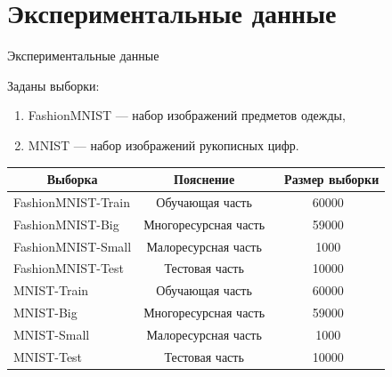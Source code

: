 \documentclass[10pt,pdf,hyperref={unicode}]{beamer}
\begin{document}
\section{Экспериментальные данные}
\begin{frame}{Экспериментальные данные}
\justifying

Заданы выборки:
\begin{enumerate}[1)]
    \item FashionMNIST --- набор изображений предметов одежды,
    \item MNIST --- набор изображений рукописных цифр.
\end{enumerate}

\begin{table}[h!t]
\begin{center}
\label{table_1}
\begin{tabular}{|c|c|c|}
\hline
	Выборка & Пояснение &\ Размер выборки\\
	\hline
	\multicolumn{1}{|l|}{FashionMNIST-Train}
	& Обучающая часть& 60000\\
	\hline
	\multicolumn{1}{|l|}{FashionMNIST-Big}
	& Многоресурсная часть& 59000\\
	\hline
	\multicolumn{1}{|l|}{FashionMNIST-Small}
	& Малоресурсная часть& 1000\\
	\hline
	\multicolumn{1}{|l|}{FashionMNIST-Test}
	& Тестовая часть& 10000\\
	\hline
	\multicolumn{1}{|l|}{MNIST-Train}
	& Обучающая часть& 60000\\
	\hline
	\multicolumn{1}{|l|}{MNIST-Big}
	& Многоресурсная часть& 59000\\
	\hline
	\multicolumn{1}{|l|}{MNIST-Small}
	& Малоресурсная часть& 1000\\
	\hline
	\multicolumn{1}{|l|}{MNIST-Test}
	& Тестовая часть& 10000\\
\hline

\end{tabular}
\end{center}
\end{table}

\end{frame}

\end{document}
